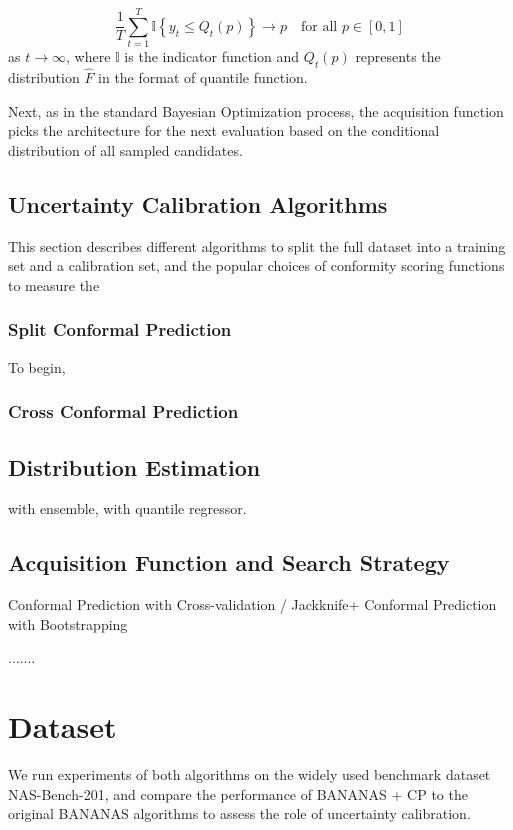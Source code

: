 \documentclass[a4paper,oneside,bibliography=totoc]{scrbook}
\begin{document}
{{\begin{equation}
\frac{1}{T} \sum_{t=1}^{T} \mathbb{I} \left\{ y_t \leq Q_t(p) \right\} \rightarrow p \quad \text{for all } p \in [0,1]
\label{eq:onlinecal}
\end{equation}
as $t \rightarrow \infty$, where $\mathbb{I}$ is the indicator function and $Q_t(p)$ represents the distribution $\hat{F}$ in the format of quantile function. 

Next, as in the standard  Bayesian Optimization process, the acquisition function picks the architecture for the next evaluation based on the conditional distribution of all sampled candidates.

\section{Uncertainty Calibration Algorithms}
\label{sec:cp}
This section describes different algorithms to split the full dataset into a training set and a calibration set, and the popular choices of conformity scoring functions to measure the 

\subsection{Split Conformal Prediction}
To begin, 
\subsection{Cross Conformal Prediction}







\section{Distribution Estimation}
with ensemble, with quantile regressor.
\label{sec:distest}
\section{Acquisition Function and Search Strategy}
\label{sec:acq}


{Conformal Prediction with Cross-validation / Jackknife+}
{Conformal Prediction with Bootstrapping}

.......
\chapter{Dataset}
\label{Dataset}
We run experiments of both algorithms on the widely used benchmark dataset NAS-Bench-201, and compare the performance of BANANAS + CP to the original BANANAS algorithms to assess the role of uncertainty calibration.
}}
\end{document}
